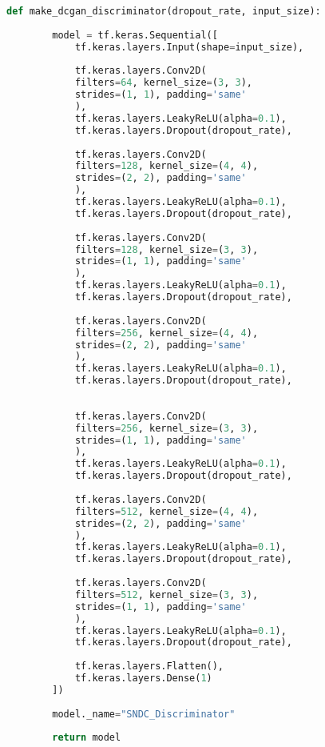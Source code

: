 \begin{lstlisting}[language=Python, caption=SNDCGAN Discriminator, label=lst:sndcDiscriminator]
	def make_dcgan_discriminator(dropout_rate, input_size):
	
		model = tf.keras.Sequential([
			tf.keras.layers.Input(shape=input_size),
			
			tf.keras.layers.Conv2D(
			filters=64, kernel_size=(3, 3),
			strides=(1, 1), padding='same'
			),
			tf.keras.layers.LeakyReLU(alpha=0.1),
			tf.keras.layers.Dropout(dropout_rate),
			
			tf.keras.layers.Conv2D(
			filters=128, kernel_size=(4, 4),
			strides=(2, 2), padding='same'
			),
			tf.keras.layers.LeakyReLU(alpha=0.1),
			tf.keras.layers.Dropout(dropout_rate),
			
			tf.keras.layers.Conv2D(
			filters=128, kernel_size=(3, 3),
			strides=(1, 1), padding='same'
			),
			tf.keras.layers.LeakyReLU(alpha=0.1),
			tf.keras.layers.Dropout(dropout_rate),
			
			tf.keras.layers.Conv2D(
			filters=256, kernel_size=(4, 4),
			strides=(2, 2), padding='same'
			),
			tf.keras.layers.LeakyReLU(alpha=0.1),
			tf.keras.layers.Dropout(dropout_rate),
			
			
			tf.keras.layers.Conv2D(
			filters=256, kernel_size=(3, 3),
			strides=(1, 1), padding='same'
			),
			tf.keras.layers.LeakyReLU(alpha=0.1),
			tf.keras.layers.Dropout(dropout_rate),
			
			tf.keras.layers.Conv2D(
			filters=512, kernel_size=(4, 4),
			strides=(2, 2), padding='same'
			),
			tf.keras.layers.LeakyReLU(alpha=0.1),
			tf.keras.layers.Dropout(dropout_rate),
			
			tf.keras.layers.Conv2D(
			filters=512, kernel_size=(3, 3),
			strides=(1, 1), padding='same'
			),
			tf.keras.layers.LeakyReLU(alpha=0.1),
			tf.keras.layers.Dropout(dropout_rate),
			
			tf.keras.layers.Flatten(),
			tf.keras.layers.Dense(1)
		])
		
		model._name="SNDC_Discriminator"
		
		return model
\end{lstlisting}
